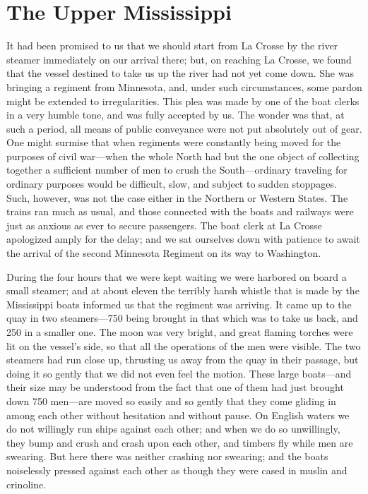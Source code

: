 \chapter{The Upper Mississippi}


It had been promised to us that we should start from La Crosse by
the river steamer immediately on our arrival there; but, on
reaching La Crosse, we found that the vessel destined to take us up
the river had not yet come down.  She was bringing a regiment from
Minnesota, and, under such circumstances, some pardon might be
extended to irregularities.  This plea was made by one of the boat
clerks in a very humble tone, and was fully accepted by us.  The
wonder was that, at such a period, all means of public conveyance
were not put absolutely out of gear.  One might surmise that when
regiments were constantly being moved for the purposes of civil
war---when the whole North had but the one object of collecting
together a sufficient number of men to crush the South---ordinary
traveling for ordinary purposes would be difficult, slow, and
subject to sudden stoppages.  Such, however, was not the case
either in the Northern or Western States.  The trains ran much as
usual, and those connected with the boats and railways were just as
anxious as ever to secure passengers.  The boat clerk at La Crosse
apologized amply for the delay; and we sat ourselves down with
patience to await the arrival of the second Minnesota Regiment on
its way to Washington.

During the four hours that we were kept waiting we were harbored on
board a small steamer; and at about eleven the terribly harsh
whistle that is made by the Mississippi boats informed us that the
regiment was arriving.  It came up to the quay in two steamers---750
being brought in that which was to take us back, and 250 in a
smaller one.  The moon was very bright, and great flaming torches
were lit on the vessel's side, so that all the operations of the
men were visible.  The two steamers had run close up, thrusting us
away from the quay in their passage, but doing it so gently that we
did not even feel the motion.  These large boats---and their size
may be understood from the fact that one of them had just brought
down 750 men---are moved so easily and so gently that they come
gliding in among each other without hesitation and without pause.
On English waters we do not willingly run ships against each other;
and when we do so unwillingly, they bump and crush and crash upon
each other, and timbers fly while men are swearing.  But here there
was neither crashing nor swearing; and the boats noiselessly
pressed against each other as though they were cased in muslin and
crinoline.

